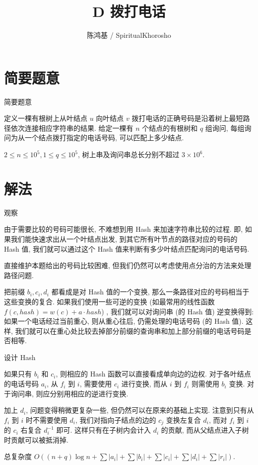\documentclass[utf8,usenames,dvipsnames]{beamer}
\author{陈鸿基 / SpiritualKhorosho}
\title{D 拨打电话}
\institute{Tsinghua University}
\begin{document}
\begin{frame}
	\titlepage
\end{frame}

\section{简要题意}

\begin{frame}{简要题意}
	
	定义一棵有根树上从叶结点 $u$ 向叶结点 $v$ 拨打电话的正确号码是沿着树上最短路径依次连接相应字符串的结果. 给定一棵有 $n$ 个结点的有根树和 $q$ 组询问, 每组询问为从一个结点拨打指定的电话号码, 可以匹配上多少结点. 

	$2\le n\le 10^5, 1\le q\le 10^5$, 树上串及询问串总长分别不超过 $3\times 10^6$.

\end{frame}

\section{解法}

\begin{frame}{观察}
	
	由于需要比较的号码可能很长, 不难想到用 Hash 来加速字符串比较的过程. 即, 如果我们能快速求出从一个叶结点出发, 到其它所有叶节点的路径对应的号码的 Hash 值, 我们就可以通过这个 Hash 值来判断有多少叶结点匹配询问的电话号码. \pause

	直接维护本题给出的号码比较困难, 但我们仍然可以考虑使用点分治的方法来处理路径问题. 

	把前缀 $b_i, c_i, d_i$ 都看成是对 Hash 值的一个变换, 那么一条路径对应的号码相当于这些变换的复合. 如果我们使用一些可逆的变换 (如最常用的线性函数 $f(c, hash) = w(c) + a\cdot hash$) , 我们就可以对询问串 (的 Hash 值) 逆变换得到: 
	如果一个电话经过当前重心, 则从重心往后, 仍需处理的电话号码 (的 Hash 值). 这样, 我们就可以在重心处比较去掉部分前缀的查询串和加上部分前缀的电话号码是否相等. 

\end{frame}

\begin{frame}{设计 Hash}
	
	如果只有 $b_i$ 和 $c_i$, 则相应的 Hash 函数可以直接看成单向边的边权. 对于各叶结点的电话号码 $a_i$, 从 $f_i$ 到 $i$, 需要使用 $c_i$ 进行变换, 而从 $i$ 到 $f_i$ 则需使用 $b_i$ 变换. 对于询问串, 则应分别用相应的逆进行变换. 

	加上 $d_i$, 问题变得稍微更复杂一些, 但仍然可以在原来的基础上实现. 注意到只有从 $f_i$ 到 $i$ 时不需要使用 $d_i$, 我们对指向子结点的边的 $c_j$ 变换左复合 $d_i$, 而对 $f_i$ 到 $i$ 的 $c_i$ 右复合 $d_i^{-1}$ 即可. 这样只有在子树内会计入 $d_i$ 的贡献, 而从父结点进入子树时贡献可以被抵消掉. 

	总复杂度 $O\left((n+q)\log n + \sum \left|a_i\right| + \sum \left|b_i\right|+ \sum \left|c_i\right|+ \sum \left|d_i\right|+ \sum \left|r_i\right|\right)$.

\end{frame}
\end{document}
